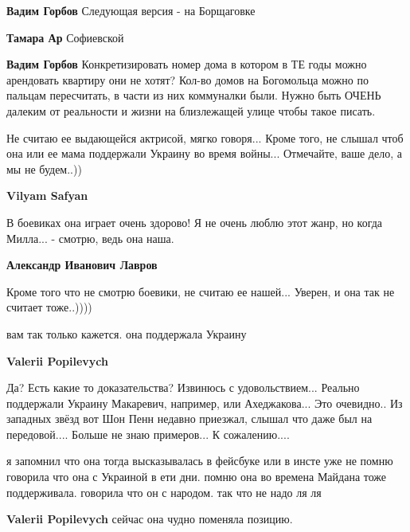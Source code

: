\begin{itemize}
\begin{itemize}
\begin{itemize} %
\textbf{Вадим Горбов} Следующая версия - на Борщаговке

\textbf{Тамара Ар} Софиевской

\textbf{Вадим Горбов} Конкретизировать номер дома в котором в ТЕ годы можно арендовать квартиру они не хотят? Кол-во домов на Богомольца можно по пальцам пересчитать, в части из них коммуналки были. Нужно быть ОЧЕНЬ далеким от реальности и жизни на близлежащей улице чтобы такое писать.
\end{itemize} %

\end{itemize} %


Не считаю ее выдающейся актрисой, мягко говоря... Кроме того, не слышал чтоб она
или ее мама поддержали Украину во время войны... Отмечайте, ваше дело, а мы не
будем..))

\begin{itemize} %
\textbf{Vilyam Safyan} 

В боевиках она играет очень здорово! Я не очень люблю этот жанр, но когда Милла...
- смотрю, ведь она наша.

\textbf{Александр Иванович Лавров} 

Кроме того что не смотрю боевики, не считаю ее нашей... Уверен, и она так не
считает тоже..))))


вам так только кажется. она поддержала Украину

\begin{itemize} %
\textbf{Valerii Popilevych} 

Да? Есть какие то доказательства? Извинюсь с удовольствием... Реально поддержали
Украину Макаревич, например, или Ахеджакова... Это очевидно.. Из западных звёзд
вот Шон Пенн недавно приезжал, слышал что даже был на передовой.... Больше не
знаю примеров... К сожалению....


я запомнил что она тогда высказывалась в фейсбуке или в инсте уже не помню
говорила что она с Украиной в ети дни. помню она во времена Майдана тоже
поддерживала. говорила что он с народом. так что не надо ля ля

\textbf{Valerii Popilevych} сейчас она чудно поменяла позицию.


\end{itemize}
\end{itemize}
\end{itemize}
